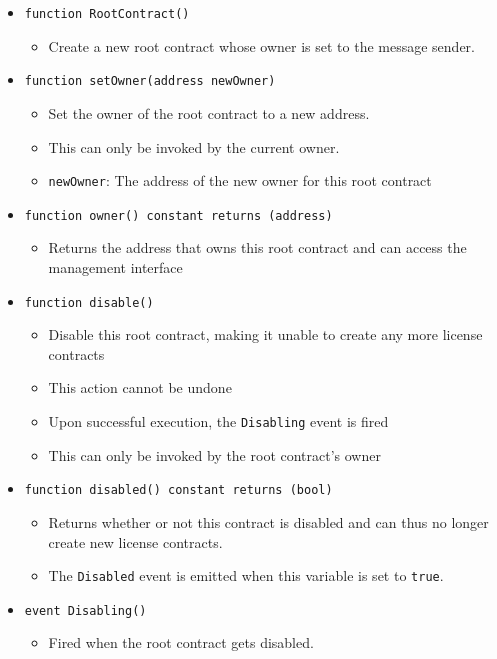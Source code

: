 \documentclass[a4paper]{article}
\begin{document}
\begin{itemize}
  \item \texttt{function RootContract()}
  \begin{itemize}
    \item Create a new root contract whose owner is set to the message sender.
  \end{itemize}
  
  \item \texttt{function setOwner(address newOwner)}
  \begin{itemize}
    \item Set the owner of the root contract to a new address.
    \item This can only be invoked by the current owner.
    \item \texttt{newOwner}: The address of the new owner for this root contract
  \end{itemize}
  
  \item \texttt{function owner() constant returns (address)}
  \begin{itemize}
    \item Returns the address that owns this root contract and can access the management interface
  \end{itemize}
  
  \item \texttt{function disable()}
  \begin{itemize}
    \item Disable this root contract, making it unable to create any more license contracts
    \item This action cannot be undone
    \item Upon successful execution, the \texttt{Disabling} event is fired
    \item This can only be invoked by the root contract's owner
  \end{itemize}
  
  \item \texttt{function disabled() constant returns (bool)}
  \begin{itemize}
    \item Returns whether or not this contract is disabled and can thus no longer create new license contracts.
    \item The \texttt{Disabled} event is emitted when this variable is set to \texttt{true}.
  \end{itemize}
  
  \item \texttt{event Disabling()}
  \begin{itemize}
    \item Fired when the root contract gets disabled.
  \end{itemize}
  

\end{itemize}
\end{document}
